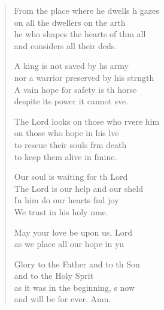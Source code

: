 \begin{verse}
\begin{patverse}
From the place where he dwells h gazes\Med\\
    on all the dwellers on the arth\\
he who shapes the hearts of thm all\Med\\
    and considers all their deds.

A king is not saved by h\pointup{\i}s army\Med\\
    nor a warrior preserved by his strngth\\
A vain hope for safety is th horse\Med\\
    despite its power it cannot sve.

The Lord looks on those who rvere him\Med\\
    on those who hope in his lve\\
to rescue their souls frm death\Med\\
    to keep them alive in fmine.

Our soul is waiting for th Lord\Med\\
    The Lord is our help and our sh\pointup{\i}eld\\
In him do our hearts f\pointup{\i}nd joy\Med\\
    We trust in his holy nme.

May your love be upon us,  Lord\Med\\
    as we place all our hope in yu

Glory to the Father and to th Son\Med\\
    and to the Holy Sp\pointup{\i}rit\\
as it was in the beginning, \pointup{\i}s now\Med\\
    and will be for ever. Amn.
  \end{patverse}
\end{verse}
